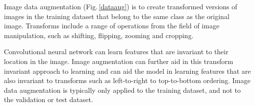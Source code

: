 Image data augmentation (Fig.\,\ref{dataaug}) is to create transformed versions of images in the training dataset that belong to the same class as the original image. Transforms include a range of operations from the field of image manipulation, such as shifting, flipping, zooming and cropping.

Convolutional neural network can learn features that are invariant to their location in the image. Image augmentation can further aid in this transform invariant approach to learning and can aid the model in learning features that are also invariant to transforms such as left-to-right to top-to-bottom ordering. Image data augmentation is typically only applied to the training dataset, and not to the validation or test dataset. 



